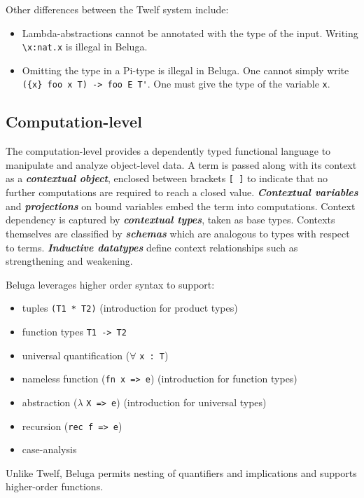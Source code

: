 \documentclass[11pt]{article}
\begin{document}
Other differences between the Twelf system include:
\begin{itemize}
\item Lambda-abstractions cannot be annotated with the type of the input. Writing \verb+\x:nat.x+ is illegal in Beluga.
\item Omitting the type in a Pi-type is illegal in Beluga. One cannot simply write \verb+({x} foo x T) -> foo E T'+. One must give the type of the variable \verb+x+.
\end{itemize}



\subsection{Computation-level}
The computation-level provides a dependently typed functional language to manipulate and analyze object-level data.
A term is passed along with its context as a \textbf{\textit{contextual object}}, enclosed between brackets \verb+[ ]+ to indicate that no further computations are required to reach a closed value.
\textbf{\textit{Contextual variables}} and \textbf{\textit{projections}} on bound variables embed the term into computations.
Context dependency is captured by \textit{\textbf{contextual types}}, taken as base types.
Contexts themselves are classified by \textit{\textbf{schemas}} which are analogous to types with respect to terms.
\textit{\textbf{Inductive datatypes}} define context relationships such as strengthening and weakening.

Beluga leverages higher order syntax to support:
\begin{itemize}
\item tuples \verb+(T1 * T2)+ (introduction for product types)
\item function types \verb+T1 -> T2+
\item universal quantification ($\forall$ \verb+x : T+)
\item nameless function (\verb+fn x => e+) (introduction for function types)
\item abstraction ($\lambda$ \verb+X => e+) (introduction for universal types)
\item recursion (\verb+rec f => e+)
\item case-analysis
\end{itemize}
Unlike Twelf, Beluga permits nesting of quantifiers and implications and supports higher-order functions.
\end{document}
